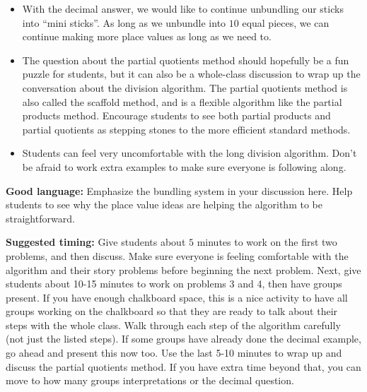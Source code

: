 \documentclass[nooutcomes,noauthor, handout]{ximera}
\begin{document}
\begin{instructorNotes}
\begin{itemize}
	\item With the decimal answer, we would like to continue unbundling our sticks into ``mini sticks''. As long as we unbundle into $10$ equal pieces, we can continue making more place values as long as we need to.
	\item The question about the partial quotients method should hopefully be a fun puzzle for students, but it can also be a whole-class discussion to wrap up the conversation about the division algorithm. The partial quotients method is also called the scaffold method, and is a flexible algorithm like the partial products method. Encourage students to see both partial products and partial quotients as stepping stones to the more efficient standard methods.
	\item Students can feel very uncomfortable with the long division algorithm. Don't be afraid to work extra examples to make sure everyone is following along.
\end{itemize}


{\bf Good language:} Emphasize the bundling system in your discussion here. Help students to see why the place value ideas are helping the algorithm to be straightforward. 

{\bf Suggested timing:} Give students about $5$ minutes to work on the first two problems, and then discuss. Make sure everyone is feeling comfortable with the algorithm and their story problems before beginning the next problem. Next, give students about 10-15 minutes to work on problems 3 and 4, then have groups present. If you have enough chalkboard space, this is a nice activity to have all groups working on the chalkboard so that they are ready to talk about their steps with the whole class. Walk through each step of the algorithm carefully (not just the listed steps). If some groups have already done the decimal example, go ahead and present this now too. Use the last 5-10 minutes to wrap up and discuss the partial quotients method. If you have extra time beyond that, you can move to how many groups interpretations or the decimal question.




\end{instructorNotes}
\end{document}
